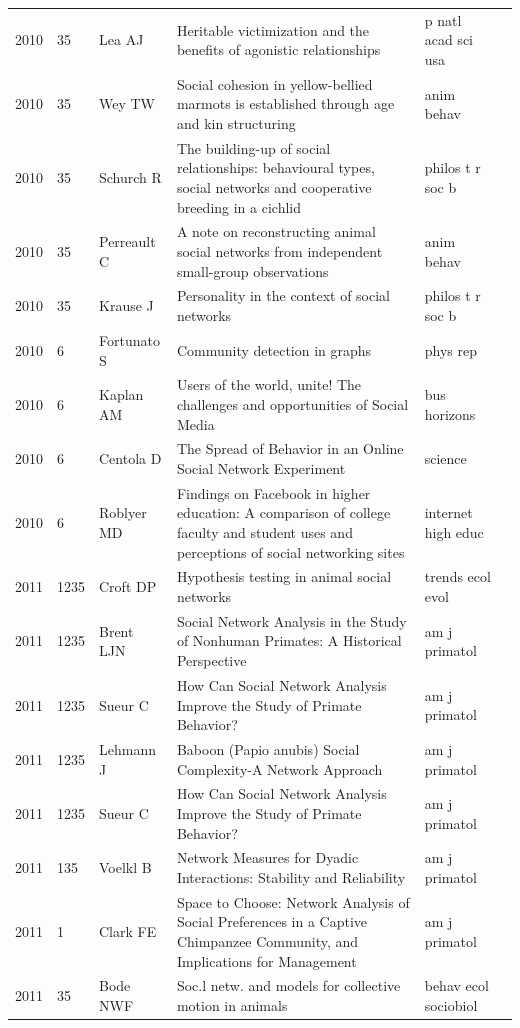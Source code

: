 \documentclass[11pt]{article} %
\begin{document}
\begin{landscape}
\begin{longtable}{p{0.7cm}|p{0.8cm}|p{3cm}|p{14.5cm}|p{3.5cm}l}
2010& 	35& 	 Lea AJ& 	 Heritable victimization and the benefits of agonistic relationships& 	 p natl acad sci usa\\
2010& 	35& 	 Wey TW& 	 Social cohesion in yellow-bellied marmots is established through age and kin structuring& 	 anim behav\\
2010& 	35& 	 Schurch R& 	 The building-up of social relationships: behavioural types, social networks and cooperative breeding in a cichlid& 	 philos t r soc b\\
2010& 	35& 	 Perreault C& 	 A note on reconstructing animal social networks from independent small-group observations& 	 anim behav\\
2010& 	35& 	 Krause J& 	 Personality in the context of social networks& 	 philos t r soc b\\
2010& 	6& 	 Fortunato S& 	 Community detection in graphs& 	 phys rep\\
2010& 	6& 	 Kaplan AM& 	 Users of the world, unite! The challenges and opportunities of Social Media& 	 bus horizons\\
2010& 	6& 	 Centola D& 	 The Spread of Behavior in an Online Social Network Experiment& 	 science\\
2010& 	6& 	 Roblyer MD& 	 Findings on Facebook in higher education: A comparison of college faculty and student uses and perceptions of social networking sites& 	 internet high educ\\
2011& 	1235& 	 Croft DP& 	 Hypothesis testing in animal social networks& 	 trends ecol evol\\
2011& 	1235& 	 Brent LJN& 	 Social Network Analysis in the Study of Nonhuman Primates: A Historical Perspective& 	 am j primatol\\
2011& 	1235& 	 Sueur C& 	 How Can Social Network Analysis Improve the Study of Primate Behavior?& 	 am j primatol\\
2011& 	1235& 	 Lehmann J& 	 Baboon (Papio anubis) Social Complexity-A Network Approach& 	 am j primatol\\
2011& 	1235& 	 Sueur C& 	 How Can Social Network Analysis Improve the Study of Primate Behavior?& 	 am j primatol\\
2011& 	135& 	 Voelkl B& 	 Network Measures for Dyadic Interactions: Stability and Reliability& 	 am j primatol\\
2011& 	1& 	 Clark FE& 	 Space to Choose: Network Analysis of Social Preferences in a Captive Chimpanzee Community, and Implications for Management& 	 am j primatol\\
2011& 	35& 	 Bode NWF& 	 Soc.l netw. and models for collective motion in animals& 	 behav ecol sociobiol\\

\end{longtable}
\end{landscape}
\end{document}
